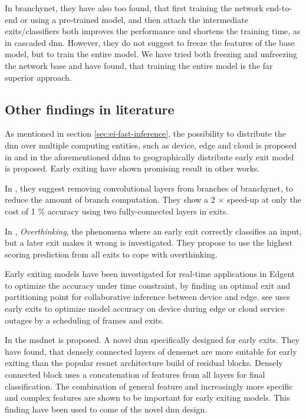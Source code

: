In \gls{branchynet}, they have also too found, that first training the network end-to-end or using a pre-trained model, and then attach the intermediate exits/classifiers both improves the performance and shortens the training time, as in cascaded \gls{dnn}. However, they do not suggest to freeze the features of the base model, but to train the entire model. We have tried both freezing and unfreezing the network base and have found, that training the entire model is the far superior approach. 

\subsection{Other findings in literature}

As mentioned in section \ref{sec:ei-fast-inference}, the possibility to distribute the \gls{dnn} over multiple computing entities, such as device, edge and cloud is proposed in \cite{leroux_cascading_2017}  and in \cite{teerapittayanon_distributed_2017} the aforementioned \gls{ddnn} to geographically distribute early exit model is proposed. Early exiting have shown promising result in other works.

In \cite{berestizshevsky_sacrificing_2019}, they suggest removing convolutional layers from branches of \gls{branchynet}, to reduce the amount of branch computation. They show a 2 $ \times $ speed-up at only the cost of 1 \% accuracy using two fully-connected layers in exits.

In \cite{kaya_shallow-deep_nodate}, \emph{Overthinking}, the phenomena where an early exit correctly classifies an input, but a later exit makes it wrong is investigated. They propose to use the highest scoring prediction from all exits to cope with overthinking. 

Early exiting models have been investigated for real-time applications in Edgent \cite{li_edge_2018} to optimize the accuracy under time constraint, by finding an optimal exit and partitioning point for collaborative inference between device and edge. \gls{see} \cite{wang_see:_2019} uses early exits to optimize model accuracy on device during edge or cloud service outages by a scheduling of frames and exits.

In \cite{huang_multi-scale_2017} the \gls{msdnet} is proposed. A novel \gls{dnn} specifically designed for early exits. They have found, that  densely connected layers of \gls{densenet} \cite{huang_densely_2016} are more suitable for early exiting than the popular \gls{resnet} architecture build of residual blocks. Densely connected block uses a concatenation of features from all layers for final classification. The combination of  general feature and increasingly more specific and complex features are shown to be important for early exiting models. This finding have been used to come of the novel \gls{dnn} design.

